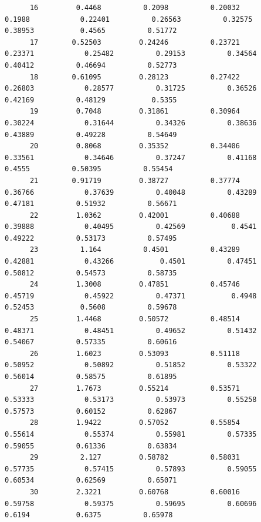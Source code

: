 \documentclass[
]{book}
\begin{document}
\begin{verbatim}
      16         0.4468          0.2098          0.20032            0.1988            0.22401          0.26563          0.32575          0.38953           0.4565          0.51772   
      17        0.52503         0.24246          0.23721           0.23371            0.25482          0.29153          0.34564          0.40412          0.46694          0.52773   
      18        0.61095         0.28123          0.27422           0.26803            0.28577          0.31725          0.36526          0.42169          0.48129           0.5355   
      19         0.7048         0.31861          0.30964           0.30224            0.31644          0.34326          0.38636          0.43889          0.49228          0.54649   
      20         0.8068         0.35352          0.34406           0.33561            0.34646          0.37247          0.41168           0.4555          0.50395          0.55454   
      21        0.91719         0.38727          0.37774           0.36766            0.37639          0.40048          0.43289          0.47181          0.51932          0.56671   
      22         1.0362         0.42001          0.40688           0.39888            0.40495          0.42569           0.4541          0.49222          0.53173          0.57495   
      23          1.164          0.4501          0.43289           0.42881            0.43266           0.4501          0.47451          0.50812          0.54573          0.58735   
      24         1.3008         0.47851          0.45746           0.45719            0.45922          0.47371           0.4948          0.52453           0.5608          0.59678   
      25         1.4468         0.50572          0.48514           0.48371            0.48451          0.49652          0.51432          0.54067          0.57335          0.60616   
      26         1.6023         0.53093          0.51118           0.50952            0.50892          0.51852          0.53322          0.56014          0.58575          0.61895   
      27         1.7673         0.55214          0.53571           0.53333            0.53173          0.53973          0.55258          0.57573          0.60152          0.62867   
      28         1.9422         0.57052          0.55854           0.55614            0.55374          0.55981          0.57335          0.59055          0.61336          0.63834   
      29          2.127         0.58782          0.58031           0.57735            0.57415          0.57893          0.59055          0.60534          0.62569          0.65071   
      30         2.3221         0.60768          0.60016           0.59758            0.59375          0.59695          0.60696           0.6194           0.6375          0.65978   

\end{verbatim}
\end{document}
